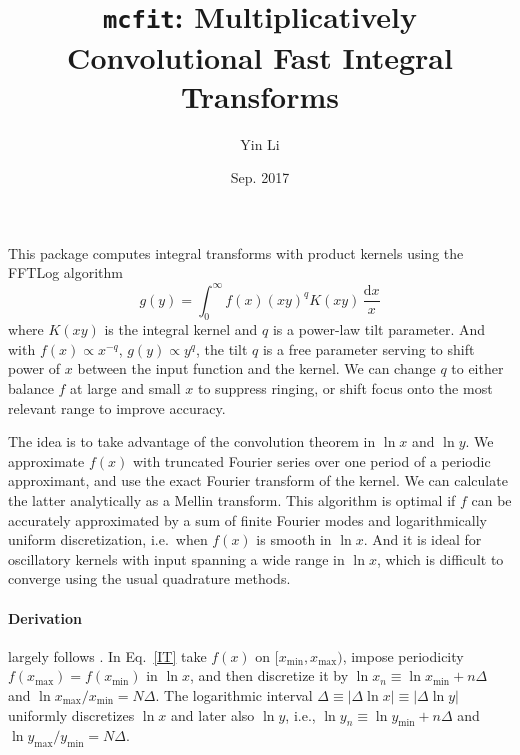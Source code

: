 \documentclass{article}
\renewcommand{\d}{\mathrm{d}}
\newcommand{\xmin}{x_\mathrm{min}}
\newcommand{\xmax}{x_\mathrm{max}}
\newcommand{\ymin}{y_\mathrm{min}}
\newcommand{\ymax}{y_\mathrm{max}}
\begin{document}
\title{\texttt{mcfit}: Multiplicatively Convolutional Fast Integral Transforms}
\author{Yin Li}
\date{Sep. 2017}
\maketitle


This package computes integral transforms with product kernels
using the FFTLog algorithm \cite{Talman78,Hamilton00}
\begin{equation}
    \label{IT}
    g(y) = \int_0^\infty f(x) (xy)^q K(xy) \,\frac{\d x}x
\end{equation}
where $K(xy)$ is the integral kernel and $q$ is a power-law tilt parameter.
And with $f(x)\propto x^{-q}$, $g(y)\propto y^q$, the tilt $q$ is a free
parameter serving to shift power of $x$ between the input function and the
kernel.
We can change $q$ to either balance $f$ at large and small $x$ to suppress
ringing, or shift focus onto the most relevant range to improve accuracy.

The idea is to take advantage of the convolution theorem in $\ln x$ and $\ln y$.
We approximate $f(x)$ with truncated Fourier series over one period of a
periodic approximant, and use the exact Fourier transform of the kernel.
We can calculate the latter analytically as a Mellin transform.
This algorithm is optimal if $f$ can be accurately approximated by a sum of
finite Fourier modes and logarithmically uniform discretization, i.e.\ when
$f(x)$ is smooth in $\ln x$.
And it is ideal for oscillatory kernels with input spanning a wide range in
$\ln x$, which is difficult to converge using the usual quadrature methods.


\paragraph{Derivation} largely follows \cite{Hamilton00}.
In Eq.~\eqref{IT} take $f(x)$ on $[\xmin, \xmax)$, impose periodicity
$f(\xmax)=f(\xmin)$ in $\ln x$, and then discretize it by
$\ln x_n\equiv\ln\xmin+n\Delta$ and $\ln\xmax/\xmin=N\Delta$.
The logarithmic interval $\Delta\equiv|\Delta\ln x|\equiv|\Delta\ln y|$
uniformly discretizes $\ln x$ and later also $\ln y$,
i.e., $\ln y_n\equiv\ln\ymin+n\Delta$ and $\ln\ymax/\ymin=N\Delta$.
\end{document}
